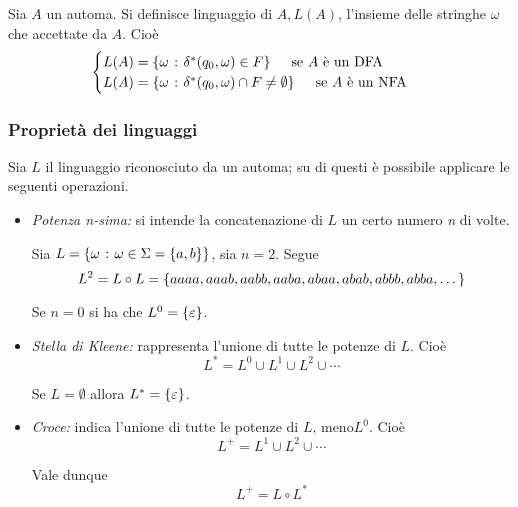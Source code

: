 \documentclass{subfiles}
\begin{document}
\begin{Definition*}
    Sia \(A\) un automa. Si definisce linguaggio di \(A, L(A)\), l'insieme delle stringhe \(\omega\) che accettate da \(A\). Cioè
    \[\begin{cases}
            L(A) = \set{\omega}{\delta^{*}(q_{0}, \omega) \in F} \quad \text{se} A \text{è un DFA} \\
            L(A) = \set{\omega}{\delta^{*}(q_{0}, \omega) \cap F \neq \emptyset} \quad \text{se} A \text{è un NFA}
        \end{cases}\]
\end{Definition*}

\subsubsection{Proprietà dei linguaggi}
Sia \(L\) il linguaggio riconosciuto da un automa; su di questi è possibile applicare le seguenti operazioni.
\begin{itemize}
    \item \emph{Potenza n-sima:} si intende la concatenazione di \(L\) un certo numero \emph{n} di volte.
          \begin{Example*}
              Sia \(L = \left\{\omega \operatorname{\: {:} \:} \omega \in \Sigma = \left\{a, b\right\}\right\}\), sia \(n = 2\). Segue
              \[
                  L^{2} = L \circ L = \left\{aaaa, aaab, aabb, aaba, abaa, abab, abbb, abba, \dots\right\}
              \]
          \end{Example*}
          \begin{Remark*}
              Se \(n = 0\) si ha che \(L^{0} = \left\{\varepsilon\right\}\).
          \end{Remark*}

    \item \emph{Stella di Kleene:} rappresenta l'unione di tutte le potenze di \(L\). Cioè
          \[
              L^{*} = L^{0} \cup L^{1} \cup L^{2} \cup \cdots
          \]
          \begin{Remark*}
              Se \(L = \emptyset\) allora \(L^{*} = \left\{\varepsilon\right\}\).
          \end{Remark*}

    \item \emph{Croce:} indica l'unione di tutte le potenze di \(L \text{, meno} L^{0}\). Cioè
          \[
              L^{+} = L^{1} \cup L^{2} \cup \cdots
          \]

          \noindent Vale dunque
          \[
              L^{+} = L \circ L^{*}
          \]
\end{itemize}
\end{document}
